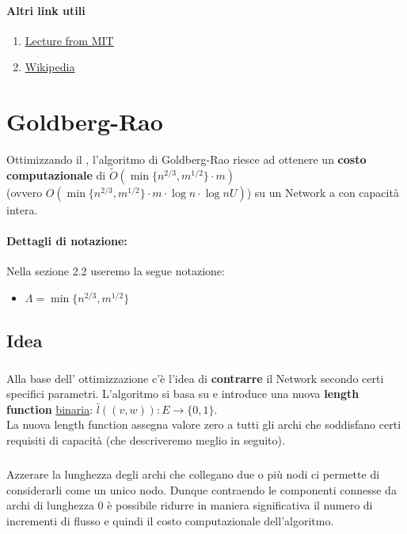 \documentclass[a4paper, 11pt]{report}
\begin{document}
\paragraph{Altri link utili}\begin{enumerate}
    \item \href{http://courses.csail.mit.edu/6.854/16/Notes/n10-blocking_flows.html}{Lecture from MIT}
    \item \href{https://en.wikipedia.org/wiki/Dinic%27s_algorithm}{Wikipedia}
\end{enumerate}
\newpage

\section{Goldberg-Rao}
\label{gbr}
Ottimizzando il , l'algoritmo di Goldberg-Rao riesce ad ottenere un \textbf{costo computazionale} di $\tilde{O}(\min\{n^{2/3}, m^{1/2}\} \cdot m)$ \\(ovvero $O(\min\{n^{2/3}, m^{1/2}\} \cdot m \cdot \log n \cdot \log nU )$)
su un Network a con capacità intera.
\paragraph*{Dettagli di notazione:}
Nella sezione 2.2 useremo la segue notazione:
\begin{itemize}
    \item $\Lambda = \min\{n^{2/3}, m^{1/2}\}$
\end{itemize}

\subsection{Idea}
    \subparagraph{}
    Alla base dell' ottimizzazione c'è l'idea di \textbf{contrarre} il Network secondo certi specifici parametri.
    L'algoritmo si basa su  e introduce una nuova \textbf{length function} \underline{binaria}: $\bar{l}((v,w)): E\rightarrow \{0,1\}$.\\
    La nuova length function assegna valore zero a tutti gli archi che soddisfano certi requisiti di capacità (che descriveremo meglio in seguito).
    \subparagraph{}
    Azzerare la lunghezza degli archi che collegano due o più nodi ci permette di considerarli come un unico nodo. 
    Dunque contraendo le componenti connesse da archi di lunghezza 0 è possibile ridurre in maniera significativa il numero di incrementi di flusso e quindi il costo computazionale dell'algoritmo.
\end{document}
